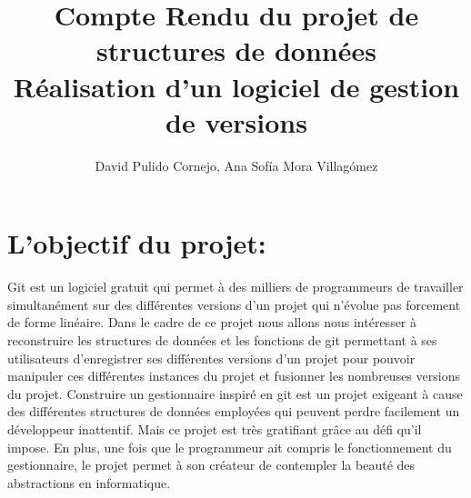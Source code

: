 \documentclass[12pt,francais]{article}
\begin{document}
\title{Compte Rendu du projet de structures de données \\ 
\large Réalisation d'un logiciel de gestion de versions}
\author{David Pulido Cornejo, Ana Sofía Mora Villagómez}
\maketitle
\section{L'objectif du projet:}
Git est un logiciel gratuit qui permet  à des milliers de programmeurs de travailler simultanément sur des différentes versions d’un projet qui n’évolue pas forcement de forme linéaire.  Dans le cadre de ce projet nous allons nous intéresser à reconstruire les structures de données et les fonctions de git permettant à ses utilisateurs d’enregistrer ses différentes versions d’un projet pour pouvoir manipuler ces différentes instances du projet et fusionner les nombreuses versions du projet.
	Construire un gestionnaire inspiré en git est un projet exigeant à cause des différentes structures de données employées qui peuvent perdre facilement un développeur inattentif. Mais ce projet est  très gratifiant grâce au défi qu’il impose. En plus, une fois que le programmeur ait compris le fonctionnement du gestionnaire, le projet permet à son créateur de contempler la beauté des abstractions en informatique.
\end{document}
